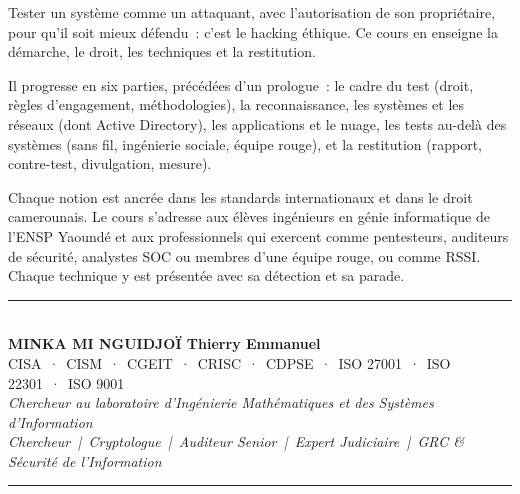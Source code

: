 \documentclass[12pt, twoside, openright, a4paper]{book}
\begin{document}
\begin{center}
\begin{minipage}{0.75\textwidth}
\color{white!85!gray}
Tester un système comme un attaquant, avec l'autorisation de son
propriétaire, pour qu'il soit mieux défendu~: c'est le hacking éthique. Ce
cours en enseigne la démarche, le droit, les techniques et la restitution.

\medskip

Il progresse en six parties, précédées d'un prologue~: le cadre du test
(droit, règles d'engagement, méthodologies), la reconnaissance, les systèmes
et les réseaux (dont Active Directory), les applications et le nuage, les
tests au-delà des systèmes (sans fil, ingénierie sociale, équipe rouge), et
la restitution (rapport, contre-test, divulgation, mesure).

\medskip

Chaque notion est ancrée dans les standards internationaux et dans le droit
camerounais. Le cours s'adresse aux élèves ingénieurs en génie informatique
de l'ENSP Yaoundé et aux professionnels qui exercent comme pentesteurs,
auditeurs de sécurité, analystes SOC ou membres d'une équipe rouge, ou
comme RSSI. Chaque technique y est présentée avec sa détection et sa
parade.
\end{minipage}
\end{center}

\vfill

\begin{center}
    {\color{CouleurAccent}\rule{0.7\linewidth}{1.2pt}}\\[1.2ex]
    {\color{white}\large\bfseries MINKA MI NGUIDJOÏ Thierry Emmanuel}\\[0.4ex]
    {\color{white!80!gray}\small
        CISA~·~CISM~·~CGEIT~·~CRISC~·~CDPSE~·~ISO 27001~·~ISO 22301~·~ISO 9001}\\[0.3ex]
    {\color{white!70!gray}\footnotesize\itshape
        Chercheur au laboratoire d'Ingénierie Mathématiques et des Systèmes d'Information}\\[0.3ex]
    {\color{white!70!gray}\footnotesize\itshape
        Chercheur~|~Cryptologue~|~Auditeur Senior~|~Expert Judiciaire~|~GRC \& Sécurité de l'Information}\\[1.2ex]
    {\color{CouleurAccent}\rule{0.7\linewidth}{1.2pt}}
\end{center}

\vspace{1cm}

\afterpage{\nopagecolor}
\end{document}
